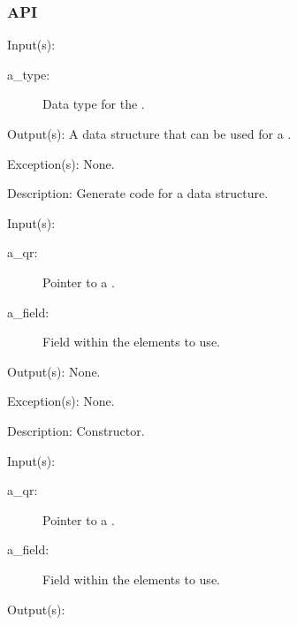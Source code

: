 \subsubsection{API}
\begin{capi}
	\begin{capilist}
	\item[Input(s): ]
		\begin{description}\item[]
		\item[a\_type: ]
			Data type for the .
		\end{description}
	\item[Output(s): ]
		A data structure that can be used for a .
	\item[Exception(s): ] None.
	\item[Description: ]
		Generate code for a  data structure.
	\end{capilist}
\label{qr_new}
	\begin{capilist}
	\item[Input(s): ]
		\begin{description}\item[]
		\item[a\_qr: ]
			Pointer to a \classname{qr}.
		\item[a\_field: ]
			Field within the  elements to use.
		\end{description}
	\item[Output(s): ] None.
	\item[Exception(s): ] None.
	\item[Description: ]
		Constructor.
	\end{capilist}
\label{qr_next}
	\begin{capilist}
	\item[Input(s): ]
		\begin{description}\item[]
		\item[a\_qr: ]
			Pointer to a .
		\item[a\_field: ]
			Field within the  elements to use.
		\end{description}
	\item[Output(s): ]

\end{capilist}
\end{capi}
